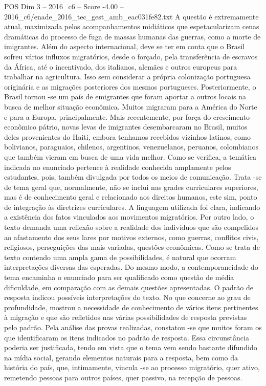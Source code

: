 \begin{textsample}{POS Dim 3 – 2016\_c6 – Score -4.00 – 2016\_c6/enade\_2016\_tec\_gest\_amb\_eac031fe82.txt}
A questão é extremamente atual, maximizada pelos acompanhamentos midiáticos que espetacularizam cenas dramáticas do processo de fuga de massas humanas das guerras, como a morte de imigrantes.
Além do aspecto internacional, deve se ter em conta que o Brasil sofreu vários influxos migratórios, desde o forçado, pela transferência de escravos da África, até o incentivado, dos italianos, alemães e outros europeus para trabalhar na agricultura.
Isso sem considerar a própria colonização portuguesa originária e as migrações posteriores dos mesmos portugueses.
Posteriormente, o Brasil tornou -se um país de emigrantes que foram aportar a outros locais na busca de melhor situação econômica.
Muitos migraram para a América do Norte e para a Europa, principalmente.
Mais recentemente, por força do crescimento econômico pátrio, novas levas de imigrantes desembarcaram no Brasil, muitos deles provenientes do Haiti, embora tenhamos recebidos vizinhos latinos, como bolivianos, paraguaios, chilenos, argentinos, venezuelanos, peruanos, colombianos que também vieram em busca de uma vida melhor.
Como se verifica, a temática indicada no enunciado pertence à realidade conhecida amplamente pelos estudantes, pois, também divulgada por todos os meios de comunicação.
Trata -se de tema geral que, normalmente, não se inclui nas grades curriculares superiores, mas é de conhecimento geral e relacionado aos direitos humanos, este sim, ponto de integração às diretrizes curriculares.
A linguagem utilizada foi clara, indicando a existência dos fatos vinculados aos movimentos migratórios.
Por outro lado, o texto demanda uma reflexão sobre a realidade dos indivíduos que são compelidos ao afastamento dos seus lares por motivos externos, como guerras, conflitos civis, religiosos, perseguições das mais variadas, questões econômicas.
Como se trata de texto contendo uma ampla gama de possibilidades, é natural que ocorram interpretações diversas das esperadas.
Do mesmo modo, a contemporaneidade do tema encaminha o enunciado para ser qualificado como questão de média dificuldade, em comparação com as demais questões apresentadas.
O padrão de resposta indicou possíveis interpretações do texto.
No que concerne ao grau de profundidade, mostrou a necessidade de conhecimento de vários itens pertinentes à migração e que são refletidos nas várias possibilidades de resposta previstas pelo padrão.
Pela análise das provas realizadas, constatou -se que muitos foram os que identificaram os itens indicados no padrão de resposta.
Essa circunstância poderia ser justificada, tendo em vista que o tema vem sendo bastante difundido na mídia social, gerando elementos naturais para a resposta, bem como da história do país, que, intimamente, vincula -se ao processo migratório, quer ativo, remetendo pessoas para outros países, quer passivo, na recepção de pessoas.

\end{textsample}
